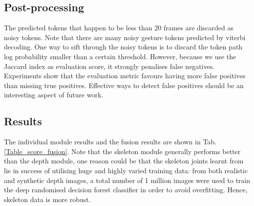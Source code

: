 \subsection{Post-processing}
The predicted tokens that happen to be less than 20 frames are discarded as noisy tokens. Note that there are many noisy gesture tokens predicted by viterbi decoding. One way to sift through the noisy tokens is to discard the token path log probability smaller than a certain threshold. However, because we use the Jaccard index as evaluation score, it strongly penalises false negatives. Experiments show that the evaluation metric favours having more false positives than missing true positives. Effective ways to detect false positives should be an interesting aspect of future work.

\subsection{Results}

The individual module results and the fusion results are shown in Tab. \ref{Table_score_fusion}. Note that the skeleton module generally performs better than the depth module, one reason could be that the skeleton joints learnt from~\cite{shotton2011real} lie in success of utilising huge and highly varied training data: from both realistic and synthetic depth images, a total number of 1 million images were used to train the deep randomised decision forest classifier in order to avoid overfitting. Hence, skeleton data is more robust.

